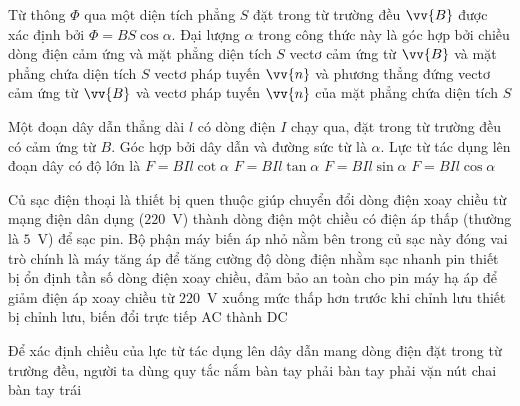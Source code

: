 	\begin{ex}%
		Từ thông $\Phi$ qua một diện tích phẳng $S$ đặt trong từ trường đều $\vv{B}$ được xác định bởi $\Phi=BS\cos\alpha$. Đại lượng $\alpha$ trong công thức này là góc hợp bởi
		\choice
		{chiều dòng điện cảm ứng và mặt phẳng diện tích $S$}
		{vectơ cảm ứng từ $\vv{B}$ và mặt phẳng chứa diện tích $S$}
		{vectơ pháp tuyến $\vv{n}$ và phương thẳng đứng}
		{\True vectơ cảm ứng từ $\vv{B}$ và vectơ pháp tuyến $\vv{n}$ của mặt phẳng chứa diện tích $S$}
	\end{ex}

	\begin{ex}%
		Một đoạn dây dẫn thẳng dài $l$ có dòng điện $I$ chạy qua, đặt trong từ trường đều có cảm ứng từ $B$. Góc hợp bởi dây dẫn và đường sức từ là $\alpha$. Lực từ tác dụng lên đoạn dây có độ lớn là
		\choice
		{$F=BIl\cot\alpha$}
		{$F=BIl\tan\alpha$}
		{\True $F=BIl\sin\alpha$}
		{$F=BIl\cos\alpha$}
	\end{ex}

	\begin{ex}%
		Củ sạc điện thoại là thiết bị quen thuộc giúp chuyển đổi dòng điện xoay chiều từ mạng điện dân dụng ($220$~V) thành dòng điện một chiều có điện áp thấp (thường là $5$~V) để sạc pin. Bộ phận máy biến áp nhỏ nằm bên trong củ sạc này đóng vai trò chính là
		\choice
		{máy tăng áp để tăng cường độ dòng điện nhằm sạc nhanh pin}
		{thiết bị ổn định tần số dòng điện xoay chiều, đảm bảo an toàn cho pin}
		{\True máy hạ áp để giảm điện áp xoay chiều từ $220$~V xuống mức thấp hơn trước khi chỉnh lưu}
		{thiết bị chỉnh lưu, biến đổi trực tiếp AC thành DC}
	\end{ex}

	\begin{ex}%
		Để xác định chiều của lực từ tác dụng lên dây dẫn mang dòng điện đặt trong từ trường đều, người ta dùng quy tắc
		\choice
		{nắm bàn tay phải}
		{bàn tay phải}
		{vặn nút chai}
		{\True bàn tay trái}
	\end{ex}

